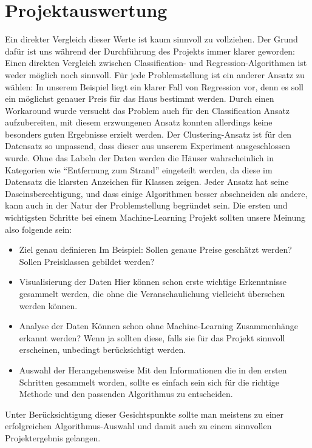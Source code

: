 \section{Projektauswertung}
\label{projektauswertung}
Ein direkter Vergleich dieser Werte ist kaum sinnvoll zu vollziehen.
Der Grund dafür ist uns während der Durchführung des Projekts immer klarer geworden:
Einen direkten Vergleich zwischen Classification- und Regression-Algorithmen ist weder möglich noch sinnvoll. Für jede Problemstellung ist ein anderer Ansatz zu wählen: 
In unserem Beispiel liegt ein klarer Fall von Regression vor, denn es soll ein möglichst genauer Preis für das Haus bestimmt werden. Durch einen Workaround wurde versucht das Problem auch für den Classification Ansatz aufzubereiten, mit diesem erzwungenen Ansatz konnten allerdings keine besonders guten Ergebnisse erzielt werden. Der Clustering-Ansatz ist für den Datensatz so unpassend, dass dieser aus unserem Experiment ausgeschlossen wurde. Ohne das Labeln der Daten werden die Häuser wahrscheinlich in Kategorien wie “Entfernung zum Strand” eingeteilt werden, da diese im Datensatz die klarsten Anzeichen für Klassen zeigen. 
\newline
Jeder Ansatz hat seine Daseinsberechtigung, und dass einige Algorithmen besser abschneiden als andere, kann auch in der Natur der Problemstellung begründet sein. 
Die ersten und wichtigsten Schritte bei einem Machine-Learning Projekt sollten unsere Meinung also folgende sein:
\begin{itemize}
\item Ziel genau definieren \newline
Im Beispiel: Sollen genaue Preise geschätzt werden? Sollen Preisklassen gebildet werden?
\item Visualisierung der Daten \newline
Hier können schon erste wichtige Erkenntnisse gesammelt werden, die ohne die Veranschaulichung vielleicht übersehen werden können.
\item Analyse der Daten \newline
Können schon ohne Machine-Learning Zusammenhänge erkannt werden? 
Wenn ja sollten diese, falls sie für das Projekt sinnvoll erscheinen, unbedingt berücksichtigt werden.
\item Auswahl der Herangehensweise \newline
Mit den Informationen die in den ersten Schritten gesammelt worden, sollte es einfach sein sich für die richtige Methode und den passenden Algorithmus zu entscheiden.
\end{itemize}
Unter Berücksichtigung dieser Gesichtspunkte sollte man meistens zu einer erfolgreichen Algorithmus-Auswahl und damit auch zu einem sinnvollen Projektergebnis gelangen.

